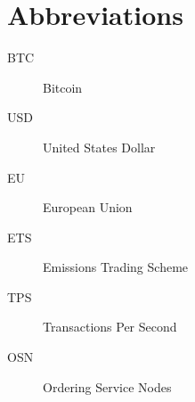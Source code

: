 \chapter*{Abbreviations}\label{abbr}
\begin{description}
    \item[BTC] Bitcoin
    \item[USD] United States Dollar
    \item[EU] European Union
    \item[ETS] Emissions Trading Scheme
    \item[TPS] Transactions Per Second
    \item[OSN] Ordering Service Nodes
\end{description}
